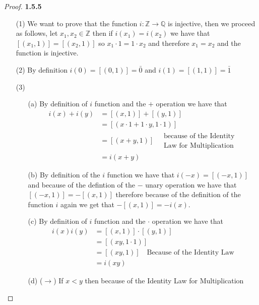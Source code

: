 \documentclass[11pt]{article}
\newcommand{\Z}{\mathbb{Z}}
\newcommand{\Q}{\mathbb{Q}}
\theoremstyle{definition}
\begin{document}
    \begin{proof}{\textbf{1.5.5}}
    \begin{itemize}
        \item [(1)]
        We want to prove that the function $i:\Z\rightarrow\Q$ is injective, then we
        proceed as follows, let $x_1, x_2 \in \Z$ then if $i(x_1)=i(x_2)$ we have that
        $[(x_1, 1)] = [(x_2, 1)]$ so $x_1\cdot 1=1 \cdot x_2$ and therefore $x_1 = x_2$
        and the function is injective.
        \item [(2)]
        By definition $i(0) = [(0,1)] =\bar{0}$ and $i(1)=[(1,1)]=\bar{1}$
        \item [(3)]
        \begin{itemize}
            \item [(a)]
            By definition of $i$ function and the $+$ operation we have that 
            \begin{align*}
                i(x)+i(y) &= [(x,1)]+[(y,1)]\\
                    &= [(x\cdot 1+1\cdot y, 1\cdot 1)]\\
                    &= [(x+y, 1)] \quad\begin{aligned}\text{because of the Identity}\\
                        \text{Law for Multiplication}\end{aligned} \\
                    &= i(x+y)
            \end{align*}
            \item [(b)]
            By definition of the $i$ function we have that $i(-x) = [(-x,1)]$ and because
            of the defintion of the $-$ unary operation we have that $[(-x,1)]=-[(x,1)]$
            therefore because of the definition of the function $i$ again we get that
            $-[(x,1)]=-i(x)$.
            \item [(c)]
            By definition of $i$ function and the $\cdot$ operation we have that
            \begin{align*}
                i(x)i(y) &= [(x,1)]\cdot[(y,1)]\\
                    &= [(xy,1\cdot 1)]\\
                    &= [(xy,1)]\quad \text{Because of the Identity Law}\\
                    &= i(xy)
            \end{align*}
            \item [(d)]
            ($\rightarrow$) If $x<y$ then because of the Identity Law for Multiplication

\end{itemize}
\end{itemize}
\end{proof}
\end{document}
